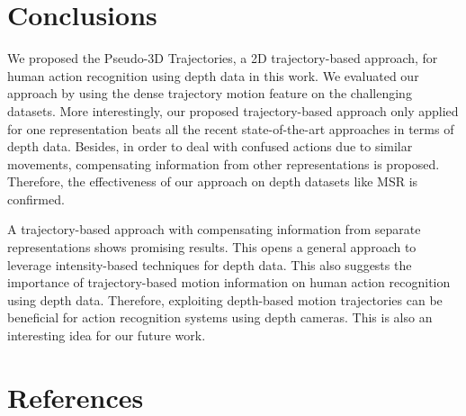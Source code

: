 \documentclass[review]{elsarticle}
\begin{document}
\section{Conclusions}
\label{lbl:Conclusions}

We proposed the Pseudo-3D Trajectories, a 2D trajectory-based approach, for human action recognition using depth data in this work. We evaluated our approach by using the dense trajectory motion feature on the challenging datasets. More interestingly, our proposed trajectory-based approach only applied for one representation beats all the recent state-of-the-art approaches in terms of depth data. Besides, in order to deal with confused actions due to similar movements, compensating information from other representations is proposed. Therefore, the effectiveness of our approach on depth datasets like MSR is confirmed.

A trajectory-based approach with compensating information from separate representations shows promising results. This opens a general approach to leverage intensity-based techniques for depth data. This also suggests the importance of trajectory-based motion information on human action recognition using depth data. Therefore, exploiting depth-based motion trajectories can be beneficial for action recognition systems using depth cameras. This is also an interesting idea for our future work.

\section*{References}



\end{document}
